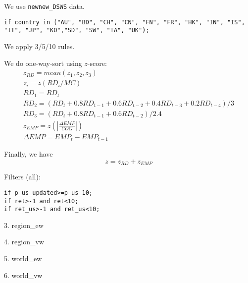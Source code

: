 

\usepackage[T1]{fontenc}




\thispagestyle{fancy}

\newcommand{\code}{\texttt}
\newcommand*{\Commonpath}{20190211/newnew/xUS-one-way-decile-big}


We use \code{newnew\_DSWS} data. 


\code{if country in ("AU", "BD", "CH", "CN", "FN", "FR", "HK", "IN", 
"IS", "IT", "JP", "KO","SD", "SW", "TA", "UK");}

We apply 3/5/10 rules.



We do one-way-sort using $z$-score:
$$
\begin{aligned}
& z_{RD} = mean(z_1, z_2, z_3) \\
& z_i = z(RD_i/MC) \\
& RD_1 = RD_t \\
& RD_2 = (RD_t + 0.8RD_{t-1} + 0.6RD_{t-2} + 0.4RD_{t-3} + 0.2RD_{t-4})/3 \\
& RD_3 = (RD_t + 0.8RD_{t-1} + 0.6RD_{t-2})/2.4 
& \\
& z_{EMP} = z(|\frac{\Delta EMP}{COG}|) \\
& \Delta EMP = EMP_t - EMP_{t-1}
\end{aligned}
$$

Finally, we have
$$
z = z_{RD} + z_{EMP}
$$


Filters (all):

\code{if p\_us\_updated>=p\_us\_10;} \\
\code{if ret>-1 and ret<10;} \\
\code{if ret\_us>-1 and ret\_us<10;} \\


\small

% 

% 

3. region\_ew


4. region\_vw


5. world\_ew


6. world\_vw



